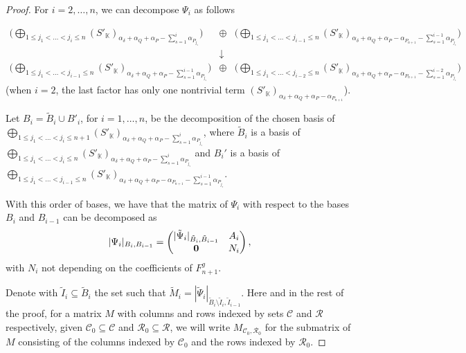 \documentclass[a4paper,11pt]{amsart}
\newcommand{\K}{\mathbb{K}}
\numberwithin{thm}{section}
\numberwithin{equation}{section}
\theoremstyle{definition}
\theoremstyle{plain}
\begin{document}
\begin{proof}
For $i=2, \dots, n$, we can decompose $\Psi_{i}$ as follows

\begin{equation}\label{dec}
\begin{array}{ccl}\bigg(\bigoplus\limits_{1\leq j_1<\ldots<j_i\leq n}(S'_\K)_{\alpha_\delta+\alpha_Q+\alpha_P-\sum\limits_{s=1}^i \alpha_{P_{j_s}}}\bigg) & \oplus &\bigg(\bigoplus\limits_{1\leq j_1<\ldots<j_{i-1}\leq n}(S'_\K)_{\alpha_\delta+\alpha_Q+\alpha_P-\alpha_{P_{n+1}}-\sum\limits_{s=1}^{i-1} \alpha_{P_{j_s}}}\bigg)
\\
& \downarrow &
\\
\bigg(\bigoplus\limits_{1\leq j_1<\ldots<j_{i-1}\leq n}(S'_\K)_{\alpha_\delta+\alpha_Q+\alpha_P-\sum\limits_{s=1}^{i-1} \alpha_{P_{j_s}}}\bigg)&\oplus&\bigg(\bigoplus\limits_{1\leq j_1<\ldots<j_{i-2}\leq n}(S'_\K)_{\alpha_\delta+\alpha_Q+\alpha_P-\alpha_{P_{n+1}}-\sum\limits_{s=1}^{i-2} \alpha_{P_{j_s}}}\bigg)
\end{array}
\end{equation}
(when $i=2$, the last factor has only one nontrivial term $(S'_\K)_{\alpha_\delta+\alpha_Q+\alpha_P-\alpha_{P_{n+1}}}$).

Let $B_i = \tilde{B}_i \cup B'_i$, for $i=1,\dots, n$, be the decomposition of the chosen basis of $\bigoplus\limits_{1\leq j_1<\ldots<j_i\leq n+1}(S'_\K)_{\alpha_\delta+\alpha_Q+\alpha_P-\sum\limits_{s=1}^i \alpha_{P_{j_s}}}$, where $\tilde{B}_i$ is a basis of $\bigoplus\limits_{1\leq j_1<\ldots<j_i\leq n}(S'_\K)_{\alpha_\delta+\alpha_Q+\alpha_P-\sum\limits_{s=1}^i \alpha_{P_{j_s}}}$ and $B_i'$ is a basis of $\bigoplus\limits_{1\leq j_1<\ldots<j_{i-1}\leq n}(S'_\K)_{\alpha_\delta+\alpha_Q+\alpha_P-\alpha_{P_{n+1}}-\sum\limits_{s=1}^{i-1} \alpha_{P_{j_s}}}$.

With this order of bases, we have that the matrix of  $\Psi_{i}$ with respect to the bases $B_i$ and $B_{i-1}$ can be decomposed as
$$|\Psi_i|_{B_i, B_{i-1}}= \begin{pmatrix}
 |\tilde{\Psi}_{i}|_{ \tilde{B}_i, \tilde{B}_{i-1}}& A_i\\
 {\bf 0}& N_i
\end{pmatrix},
$$
with $N_i$ not depending on the coefficients of $F^g_{n+1}.$

Denote with $\tilde{I}_i\subseteq \tilde{B}_i$ the set such that
$\tilde{M}_i = |\tilde{\Psi}_{i}|_{ \tilde{B}_i\setminus \tilde{I}_i, \tilde{I}_{i-1}}$. Here and in the rest of the proof, for a matrix $M$ with columns and rows indexed by sets $\mathcal{C}$ and $\mathcal{R}$ respectively, given $\mathcal{C}_0\subseteq \mathcal{C}$ and $\mathcal{R}_0\subseteq \mathcal{R}$, we will write $M_{\mathcal{C}_0,\mathcal{R}_0}$ for the submatrix of $M$ consisting of the columns indexed by $\mathcal{C}_0$ and the rows indexed by $\mathcal{R}_0$.



\end{proof}
\end{document}
